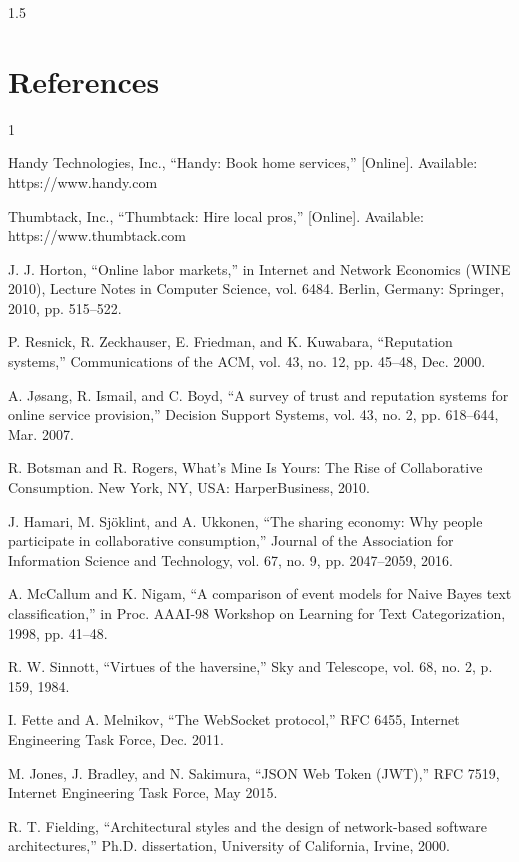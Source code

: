 \documentclass[A4paper,12pt]{report}
\theoremstyle{plain}
\theoremstyle{definition}
\theoremstyle{remark}
\numberwithin{equation}{section}
\renewenvironment{thebibliography}[1]{
  \begin{oldthebibliography}{#1}
    \setlength{\itemsep}{0em}
}
{
  \end{oldthebibliography}
}
\begin{document}
\begin{spacing}{1.5}
\chapter*{References}

\begin{thebibliography}{1}
\vspace{-6cm}
 Handy Technologies, Inc., ``Handy: Book home services,'' [Online]. Available: https://www.handy.com

 Thumbtack, Inc., ``Thumbtack: Hire local pros,'' [Online]. Available: https://www.thumbtack.com

 J. J. Horton, ``Online labor markets,'' in Internet and Network Economics (WINE 2010), Lecture Notes in Computer Science, vol. 6484. Berlin, Germany: Springer, 2010, pp. 515–522.

 P. Resnick, R. Zeckhauser, E. Friedman, and K. Kuwabara, ``Reputation systems,'' Communications of the ACM, vol. 43, no. 12, pp. 45–48, Dec. 2000.

 A. Jøsang, R. Ismail, and C. Boyd, ``A survey of trust and reputation systems for online service provision,'' Decision Support Systems, vol. 43, no. 2, pp. 618–644, Mar. 2007.

 R. Botsman and R. Rogers, What's Mine Is Yours: The Rise of Collaborative Consumption. New York, NY, USA: HarperBusiness, 2010.

 J. Hamari, M. Sjöklint, and A. Ukkonen, ``The sharing economy: Why people participate in collaborative consumption,'' Journal of the Association for Information Science and Technology, vol. 67, no. 9, pp. 2047–2059, 2016.

 A. McCallum and K. Nigam, ``A comparison of event models for Naive Bayes text classification,'' in Proc. AAAI-98 Workshop on Learning for Text Categorization, 1998, pp. 41–48.

 R. W. Sinnott, ``Virtues of the haversine,'' Sky and Telescope, vol. 68, no. 2, p. 159, 1984.

 I. Fette and A. Melnikov, ``The WebSocket protocol,'' RFC 6455, Internet Engineering Task Force, Dec. 2011.

 M. Jones, J. Bradley, and N. Sakimura, ``JSON Web Token (JWT),'' RFC 7519, Internet Engineering Task Force, May 2015.

 R. T. Fielding, ``Architectural styles and the design of network-based software architectures,'' Ph.D. dissertation, University of California, Irvine, 2000.


\end{thebibliography}
\end{spacing}
\end{document}

